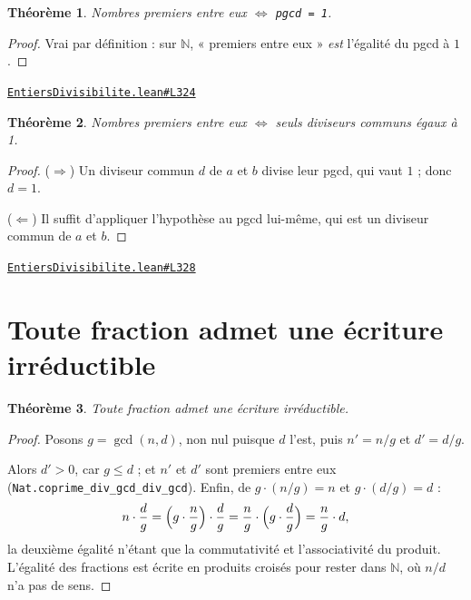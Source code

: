 \documentclass[11pt,a4paper]{article}
\theoremstyle{definition}
\theoremstyle{plain}
\newtheorem{theoreme}{Théorème}
\newcommand{\source}[2]{\par\smallskip\noindent\hfill{\footnotesize\href{#1}{\texttt{#2}}}\par\smallskip}
\begin{document}
\begin{theoreme}
Nombres premiers entre eux \(\iff\) \texttt{pgcd = 1}.
\end{theoreme}

\begin{proof}
Vrai par définition : sur $\mathbb{N}$, « premiers entre eux » \emph{est} l'égalité du
pgcd à $1$.
\end{proof}

\source{https://github.com/Commutator-IO/learn-lean/blob/main/cours/01-college/07-enonces-conserves/EntiersDivisibilite.lean\#L324}{EntiersDivisibilite.lean\#L324}

\begin{theoreme}
Nombres premiers entre eux \(\iff\) seuls diviseurs communs égaux à 1.
\end{theoreme}

\begin{proof}
($\Rightarrow$) Un diviseur commun $d$ de $a$ et $b$ divise leur pgcd, qui vaut $1$ ;
donc $d = 1$.

($\Leftarrow$) Il suffit d'appliquer l'hypothèse au pgcd lui-même, qui est un diviseur
commun de $a$ et $b$.
\end{proof}

\source{https://github.com/Commutator-IO/learn-lean/blob/main/cours/01-college/07-enonces-conserves/EntiersDivisibilite.lean\#L328}{EntiersDivisibilite.lean\#L328}

\section{Toute fraction admet une écriture irréductible}

\begin{theoreme}
Toute fraction admet une écriture irréductible.
\end{theoreme}

\begin{proof}
Posons $g = \gcd(n,d)$, non nul puisque $d$ l'est, puis $n' = n/g$ et $d' = d/g$.

Alors $d' > 0$, car $g \le d$ ; et $n'$ et $d'$ sont premiers entre eux
(\texttt{Nat.coprime\_div\_gcd\_div\_gcd}). Enfin, de $g \cdot (n/g) = n$ et
$g \cdot (d/g) = d$ :
\[
n \cdot \frac{d}{g}
 = \Bigl(g \cdot \frac{n}{g}\Bigr) \cdot \frac{d}{g}
 = \frac{n}{g} \cdot \Bigl(g \cdot \frac{d}{g}\Bigr)
 = \frac{n}{g} \cdot d ,
\]
la deuxième égalité n'étant que la commutativité et l'associativité du produit. L'égalité
des fractions est écrite en produits croisés pour rester dans $\mathbb{N}$, où $n/d$ n'a
pas de sens.
\end{proof}
\end{document}
